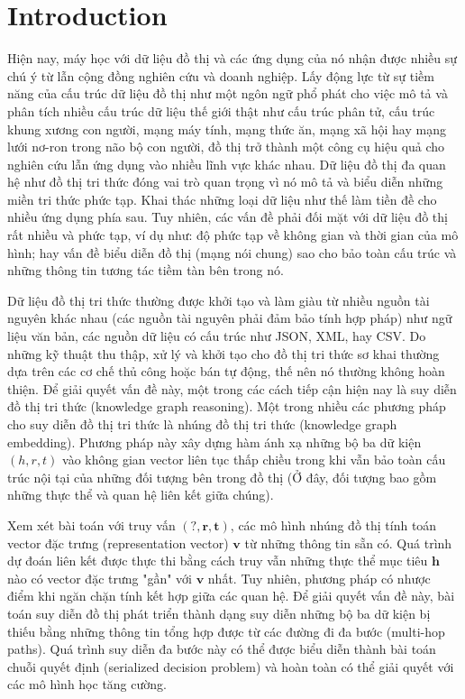 \section{Introduction}
Hiện nay, máy học với dữ liệu đồ thị và các ứng dụng của nó nhận được nhiều sự chú ý từ lẫn cộng đồng nghiên cứu và doanh nghiệp. Lấy động lực từ sự tiềm năng của cấu trúc dữ liệu đồ thị như một ngôn ngữ phổ phát cho việc mô tả và phân tích nhiều cấu trúc dữ liệu thế giới thật như cấu trúc phân tử, cấu trúc khung xương con người, mạng máy tính, mạng thức ăn, mạng xã hội hay mạng lưới nơ-ron trong não bộ con người, đồ thị trở thành một công cụ hiệu quả cho nghiên cứu lẫn ứng dụng vào nhiều lĩnh vực khác nhau. Dữ liệu đồ thị đa quan hệ như đồ thị tri thức đóng vai trò quan trọng vì nó mô tả và biểu diễn những miền tri thức phức tạp. Khai thác những loại dữ liệu như thế làm tiền đề cho nhiều ứng dụng phía sau. Tuy nhiên, các vấn đề phải đối mặt với dữ liệu đồ thị rất nhiều và phức tạp, ví dụ như: độ phức tạp về không gian và thời gian của mô hình; hay vấn đề biểu diễn đồ thị (mạng nói chung) sao cho bảo toàn cấu trúc và những thông tin tương tác tiềm tàn bên trong nó.

Dữ liệu đồ thị tri thức thường được khởi tạo và làm giàu từ nhiều nguồn tài nguyên khác nhau (các nguồn tài nguyên phải đảm bảo tính hợp pháp) như ngữ liệu văn bản, các nguồn dữ liệu có cấu trúc như JSON, XML, hay CSV. Do những kỹ thuật thu thập, xử lý và khởi tạo cho đồ thị tri thức sơ khai thường dựa trên các cơ chế thủ công hoặc bán tự động, thế nên nó thường không hoàn thiện. Để giải quyết vấn đề này, một trong các cách tiếp cận hiện nay là suy diễn đồ thị tri thức (knowledge graph reasoning). Một trong nhiều các phương pháp cho suy diễn đồ thị tri thức là nhúng đồ thị tri thức (knowledge graph embedding). Phương pháp này xây dựng hàm ánh xạ những bộ ba dữ kiện $(h, r, t)$ vào không gian vector liên tục thấp chiều trong khi vẫn bảo toàn cấu trúc nội tại của những đối tượng bên trong đồ thị (Ở đây, đối tượng bao gồm những thực thể và quan hệ liên kết giữa chúng).

Xem xét bài toán với truy vấn $(?, \mathbf{r}, \mathbf{t})$, các mô hình nhúng đồ thị tính toán vector đặc trưng (representation vector) $\mathbf{v}$ từ những thông tin sẵn có. Quá trình dự đoán liên kết được thực thi bằng cách truy vẫn những thực thể mục tiêu $\mathbf{h}$ nào có vector đặc trưng "gần" với $\mathbf{v}$ nhất. Tuy nhiên, phương pháp có nhược điểm khi ngăn chặn tính kết hợp giữa các quan hệ. Để giải quyết vấn đề này, bài toán suy diễn đồ thị phát triển thành dạng suy diễn những bộ ba dữ kiện bị thiếu bằng những thông tin tổng hợp được từ các đường đi đa bước (multi-hop paths). Quá trình suy diễn đa bước này có thể được biểu diễn thành bài toán chuỗi quyết định (serialized decision problem) và hoàn toàn có thể giải quyết với các mô hình học tăng cường.

